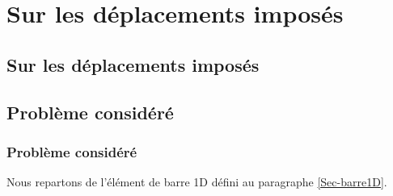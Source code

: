 \ifVersionAvecExemplesSepares
   \chapter{Sur les déplacements imposés}\label{Ch-DispLag}%
\else
   \section{Sur les déplacements imposés}\label{Ch-DispLag}%
\fi

\medskip
\ifVersionAvecExemplesSepares
   \section{Problème considéré}
\else
   \subsection{Problème considéré}
\fi

Nous repartons de l'élément de barre 1D défini au paragraphe \ref{Sec-barre1D}.

